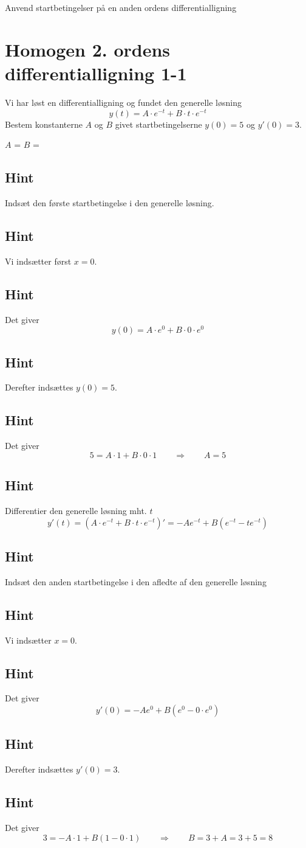 \documentclass{article}
\newenvironment{exercise}[1]{\newpage\section{#1}}{}
\newcommand{\answerbox}[1]{\fbox{$#1$}}
\newcommand{\hint}{\subsection*{Hint}}
\begin{document}
Anvend startbetingelser på en anden ordens differentialligning
\tableofcontents
\newpage


\begin{exercise}{Homogen 2. ordens differentialligning 1-1}

Vi har løst en differentialligning og fundet den generelle løsning
\[
y(t) = A \cdot e^{-t} + B \cdot t \cdot e^{-t}
\]
Bestem konstanterne $A$ og $B$ givet startbetingelserne $y(0)=5$ og $y'(0)=3$.


$A$ = \answerbox{5}		
$B$ = \answerbox{8}

\hint

Indsæt den første startbetingelse i den generelle løsning. 


\hint

Vi indsætter først $x=0$.

\hint

Det giver
\[
y(0)=  A \cdot e^{0} + B \cdot 0 \cdot e^{0}
\]

\hint

Derefter indsættes $y(0)=5$.

\hint 

Det giver 
\[
5 = A \cdot 1 + B \cdot 0 \cdot 1 \qquad \Rightarrow \qquad A = 5
\]

\hint 

Differentier den generelle løsning mht. $t$
\[
y'(t)= \left(A \cdot e^{-t} + B \cdot t \cdot e^{-t} \right)' = -A e^{-t} + B \left( e^{-t} - t e^{-t} \right)
\]

\hint 

Indsæt den anden startbetingelse i den afledte af den generelle løsning

\hint

Vi indsætter $x=0$.

\hint 

Det giver
\[
y'(0) = -A e^{0} + B \left( e^{0} - 0 \cdot e^{0} \right)
\]

\hint 

Derefter indsættes $y'(0)=3$.

\hint

Det giver
\[
3 = -A \cdot 1 + B \left(1- 0 \cdot 1 \right) \qquad \Rightarrow \qquad B = 3 + A = 3 + 5 = 8
\]






\end{exercise}

\newpage
\end{document}
